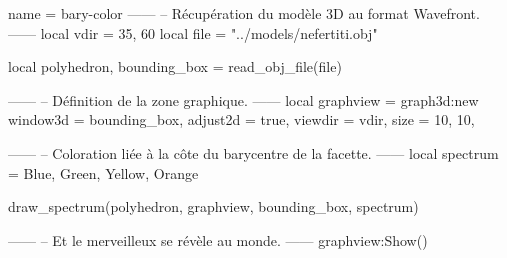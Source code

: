 \documentclass{standalone}
\begin{document}
\begin{luadraw}{name = bary-color}
------
-- Récupération du modèle 3D au format Wavefront.
------
local vdir = {35, 60}
local file = "../models/nefertiti.obj"

local polyhedron, bounding_box = read_obj_file(file)

------
-- Définition de la zone graphique.
------
local graphview = graph3d:new{
  window3d = bounding_box,
  adjust2d = true,
  viewdir  = vdir,
  size     = {10, 10},
}

------
-- Coloration liée à la côte du barycentre de la facette.
------
local spectrum = {Blue, Green, Yellow, Orange}

draw_spectrum(polyhedron, graphview, bounding_box, spectrum)

------
-- Et le merveilleux se révèle au monde.
------
graphview:Show()
\end{luadraw}
\end{document}
